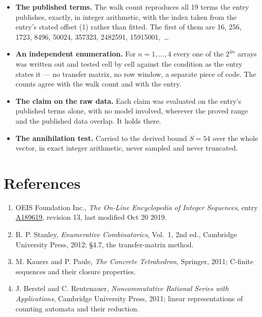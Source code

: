 \documentclass[11pt]{article}
\theoremstyle{definition}
\begin{document}
\begin{itemize}

\item {\bfseries The published terms.} The walk count reproduces all 19 terms the entry publishes, exactly, in integer arithmetic, with the index taken from the entry's stated offset (1) rather than fitted. The first of them are 16, 256, 1723, 8496, 50024, 357323, 2482591, 15915001,~\dots

\item {\bfseries An independent enumeration.} For $n = 1,\dots,4$ every one of the $2^{4n}$ arrays was written out and tested cell by cell against the condition as the entry states it --- no transfer matrix, no row window, a separate piece of code. The counts agree with the walk count and with the entry.

\item {\bfseries The claim on the raw data.} Each claim was evaluated on the entry's published terms alone, with no model involved, wherever the proved range and the published data overlap. It holds there.

\item {\bfseries The annihilation test.} Carried to the derived bound $S = 54$ over the whole vector, in exact integer arithmetic, never sampled and never truncated.

\end{itemize}

\section{References}

\begin{enumerate}

\item OEIS Foundation Inc., \emph{The On-Line Encyclopedia of Integer Sequences}, entry \href{https://oeis.org/A189619}{A189619}, revision 13, last modified Oct 20 2019.

\item R. P. Stanley, \emph{Enumerative Combinatorics}, Vol.~1, 2nd ed., Cambridge University Press, 2012; \S4.7, the transfer-matrix method.

\item M. Kauers and P. Paule, \emph{The Concrete Tetrahedron}, Springer, 2011; C-finite sequences and their closure properties.

\item J. Berstel and C. Reutenauer, \emph{Noncommutative Rational Series with Applications}, Cambridge University Press, 2011; linear representations of counting automata and their reduction.

\end{enumerate}
\end{document}
